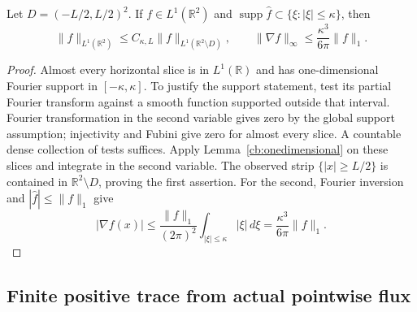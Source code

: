 \begin{corollary}
\label{cb:planarobservation}
Let $D=(-L/2,L/2)^2$. If $f\in L^1(\mathbb R^2)$ and
$\operatorname{supp}\widehat f\subset\{\xi:|\xi|\leq\kappa\}$, then
\begin{equation}
 \|f\|_{L^1(\mathbb R^2)}
 \leq C_{\kappa,L}\|f\|_{L^1(\mathbb R^2\setminus D)},\qquad
 \|\nabla f\|_\infty
 \leq\frac{\kappa^3}{6\pi}\|f\|_1.
 \label{cb:planarestimates}
\end{equation}
\end{corollary}
\begin{proof}
Almost every horizontal slice is in $L^1(\mathbb R)$ and has one-dimensional
Fourier support in $[-\kappa,\kappa]$. To justify the support statement,
test its partial Fourier transform against a smooth function supported
outside that interval. Fourier transformation in the second variable gives
zero by the global support assumption; injectivity and Fubini give zero for
almost every slice. A countable dense collection of tests suffices.
Apply Lemma~\ref{cb:onedimensional} on these slices and integrate in the
second variable. The observed strip $\{|x|\geq L/2\}$ is contained in
$\mathbb R^2\setminus D$, proving the first assertion. For the second,
Fourier inversion and $|\widehat f|\leq\|f\|_1$ give
\begin{equation}
 |\nabla f(x)|\leq\frac{\|f\|_1}{(2\pi)^2}
       \int_{|\xi|\leq\kappa}|\xi|\,d\xi
   =\frac{\kappa^3}{6\pi}\|f\|_1.
 \label{cb:planarderivative}
\end{equation}
\end{proof}

\subsection{Finite positive trace from actual pointwise flux}


